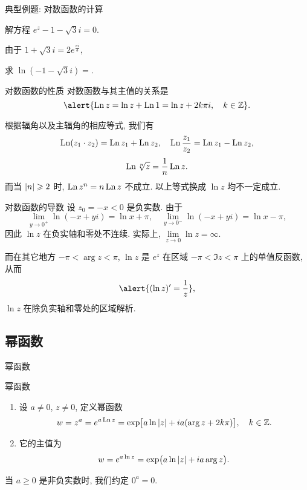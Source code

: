 \begin{frame}{典型例题: 对数函数的计算}
	\onslide<+->
	\begin{example}
		解方程 $e^z-1-\sqrt 3i=0$.
	\end{example}

	\onslide<+->
	\begin{solution}
		由于 $1+\sqrt 3 i=2e^{\frac{\pi i}3}$,
		\onslide<+->{因此
		\[z=\Ln(1+\sqrt 3i)=\ln 2+\left(2k+\frac13\right)\pi i,\quad k\in\BZ.\]}
		\vspace{-\baselineskip}
	\end{solution}

	\onslide<+->
	\begin{exercise}
		求 $\ln(-1-\sqrt3 i)=$.
	\end{exercise}
\end{frame}


\begin{frame}{对数函数的性质}
	\onslide<+->
	对数函数与其主值的关系是
	\[\alert{\Ln z=\ln z+\Ln 1=\ln z+2k\pi i,\quad k\in\BZ}.\]

	\onslide<+->
	根据辐角以及主辐角的相应等式, 我们有
	\[\operatorname{Ln}(z_1\cdot z_2)=\operatorname{Ln} z_1+\operatorname{Ln} z_2,\quad
	\operatorname{Ln}\frac{z_1}{z_2}=\operatorname{Ln} z_1-\operatorname{Ln} z_2,\]
	\[\operatorname{Ln} \sqrt[n]z=\dfrac1n\operatorname{Ln} z.\]
	\onslide<+->
	而当 $\left|n\right|\geqslant 2$ 时, \alert{$\operatorname{Ln} z^n=n\operatorname{Ln} z$ 不成立}.
	\onslide<+->
	以上等式换成 $\ln z$ 均不一定成立.
\end{frame}


\begin{frame}{对数函数的导数}
	\onslide<+->
	设 $z_0=-x<0$ 是负实数.
	\onslide<+->
	由于
	\[\lim_{y\to0^+}\ln (-x+yi)=\ln x+\pi,\quad
	\lim_{y\to0^-}\ln (-x+yi)=\ln x-\pi,\]
	\onslide<+->
	因此 $\ln z$ 在负实轴和零处不连续.
	\onslide<+->
	实际上, $\lim\limits_{z\to 0}\ln z=\infty$.

	\onslide<+->
	而在其它地方 $-\pi<\arg z<\pi$, $\ln z$ 是 $e^z$ 在区域 $-\pi<\Im z<\pi$ 上的单值反函数, 
	\onslide<+->
	从而
	\[\alert{(\ln z)'=\frac 1z},\]
	\alert{$\ln z$ 在除负实轴和零处的区域解析}.
\end{frame}


\subsection{幂函数}
	\begin{frame}{幂函数}
	\onslide<+->
	\begin{alertblock}{幂函数}
		\begin{enumerate}
			\item 设 $a\neq 0$, $z\neq 0$, 定义幂函数
			\[w=z^a=e^{a\operatorname{Ln} z}
			=\exp\bigl[a\ln\left|z\right|+ia(\arg z+2k\pi)\bigr],\quad k\in{\mathbb{Z}}.\]
			\item 它的主值为
			\[w=e^{a\ln z}=\exp\bigl(a\ln\left|z\right|+ia\arg z\bigr).\]
		\end{enumerate}
		\vspace{-\baselineskip}
	\end{alertblock}

	\onslide<+->
	当 $a\ge 0$ 是非负实数时, 我们约定 $0^a=0$.
\end{frame}


